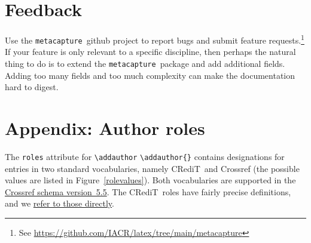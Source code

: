 \documentclass{article}
\newcommand{\pkgname}{\texttt{metacapture}}
\newcommand\CREDIT{CRediT}
\newcommand{\cmd}[2][]{%
  \def\FirstArg{#1}%
  \ifx\FirstArg\empty%
    \texttt{\textbackslash{}#2}%
  \else%
    \texttt{\textbackslash{}#2\{#1\}}%
  \fi
}
\begin{document}
\section{Feedback}
Use the \pkgname\ github project to report bugs and submit feature
requests.\footnote{See \url{https://github.com/IACR/latex/tree/main/metacapture}}
If
your feature is only relevant to a specific discipline, then perhaps
the natural thing to do is to extend the \pkgname\ package and add
additional fields. Adding too many fields and too much complexity can
make the documentation hard to digest.


\ShowRoles %
\appendix
\section{Appendix: Author roles}\label{roles}
The \texttt{roles} attribute for \cmd{addauthor} contains designations
for entries in two standard vocabularies, namely \CREDIT\ and Crossref
(the possible values are listed in Figure~\ref{rolevalues}).  Both
vocabularies are supported in
the \href{https://data.crossref.org/reports/help/schema_doc/5.5.0/index.html}{Crossref
schema version~5.5}.  The \CREDIT\ roles have fairly precise
definitions, and
we \href{https://doi.org/10.5281/zenodo.18421448}{refer to those
directly}.
\end{document}
